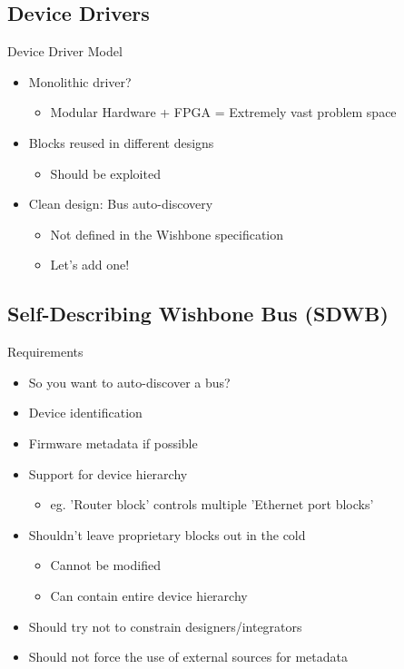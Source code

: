 \documentclass{beamer}
\begin{document}
\subsection{Device Drivers}
\begin{frame}{Device Driver Model}
  \begin{itemize}
    \item Monolithic driver? %
      \begin{itemize}
        \pause \item Modular Hardware + FPGA = Extremely vast problem space
      \end{itemize}
    \pause \item Blocks reused in different designs
      \begin{itemize}
        \pause \item Should be exploited
      \end{itemize}
    \pause \item Clean design: Bus auto-discovery
      \begin{itemize}
        \pause \item Not defined in the Wishbone specification
        \pause \item Let's add one!
      \end{itemize}
  \end{itemize}
\end{frame}

\subsection{Self-Describing Wishbone Bus (SDWB)}
\begin{frame}{Requirements}
  \begin{itemize}
    \item So you want to auto-discover a bus?
    \pause \item Device identification
    \pause \item Firmware metadata if possible
    \pause \item Support for device hierarchy
      \begin{itemize}
        \pause \item eg. 'Router block' controls multiple 'Ethernet port blocks'
      \end{itemize}
    \pause \item Shouldn't leave proprietary blocks out in the cold
      \begin{itemize}
        \pause \item Cannot be modified
	\pause \item Can contain entire device hierarchy
      \end{itemize}
    \pause \item Should try not to constrain designers/integrators
    \pause \item Should not force the use of external sources for metadata
  \end{itemize}
\end{frame}
\end{document}
